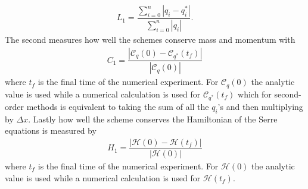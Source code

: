 \documentclass[SingleSpace,12pt,Journal]{Serre_ASCE}
\begin{document}
\begin{gather}
L_1 = \dfrac{\sum_{i = 0}^{n} \left| q_i - q^*_i\right|}{\sum_{i = 0}^{n} \left| q_i\right|}.
\end{gather}
The second measures how well the schemes conserve mass and momentum with
\begin{gather}
C_1 = \dfrac{\left| \mathcal{C}_q(0) - \mathcal{C}_{q^*}(t_f) \right|}{\left| \mathcal{C}_q(0) \right|}
\end{gather}
where $t_f$ is the final time of the numerical experiment. For $\mathcal{C}_q(0)$ the analytic value is used while a numerical calculation is used for $\mathcal{C}_{q^*}(t_f)$ which for second-order methods is equivalent to taking the sum of all the $q_i$'s and then multiplying by $\Delta x$. Lastly how well the scheme conserves the Hamiltonian of the Serre equations is measured by 
\begin{gather}
H_1 = \dfrac{\left| \mathcal{H}(0) - \mathcal{H}(t_f) \right|}{\left| \mathcal{H}(0) \right|}
\end{gather}
where $t_f$ is the final time of the numerical experiment. For $\mathcal{H}(0)$ the analytic value is used while a numerical calculation is used for $\mathcal{H}(t_f)$.
%
\end{document}
